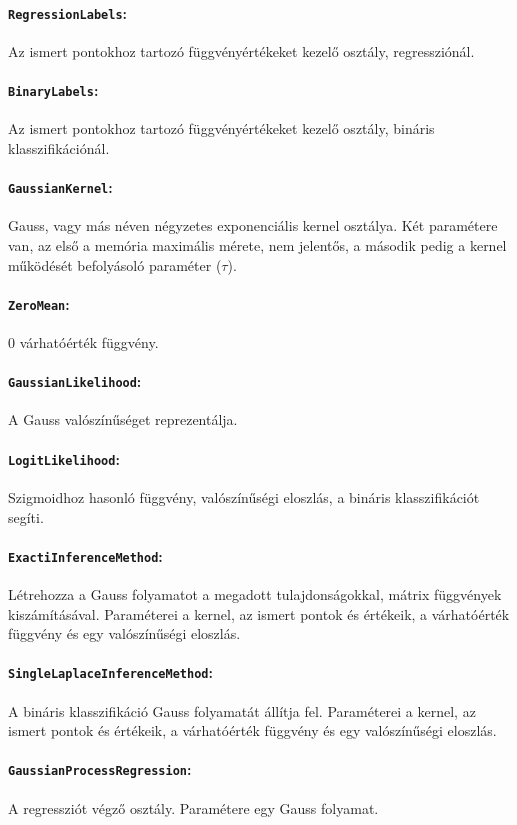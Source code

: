 \paragraph{\texttt{RegressionLabels}:}
Az ismert pontokhoz tartozó függvényértékeket kezelő osztály, regressziónál.
\paragraph{\texttt{BinaryLabels}:} 
Az ismert pontokhoz tartozó függvényértékeket kezelő osztály, bináris klasszifikációnál.
\paragraph{\texttt{GaussianKernel}:}
Gauss, vagy más néven négyzetes exponenciális kernel osztálya. Két paramétere van, az első a memória maximális mérete, nem jelentős, a második pedig a kernel működését befolyásoló paraméter ($\tau$).
\paragraph{\texttt{ZeroMean}:}
0 várhatóérték függvény.
\paragraph{\texttt{GaussianLikelihood}:}
A Gauss valószínűséget reprezentálja.
\paragraph{\texttt{LogitLikelihood}:}
Szigmoidhoz hasonló függvény, valószínűségi eloszlás, a bináris klasszifikációt segíti.
\paragraph{\texttt{ExactiInferenceMethod}:}
Létrehozza a Gauss folyamatot a megadott tulajdonságokkal, mátrix függvények kiszámításával. Paraméterei a kernel, az ismert pontok és értékeik, a várhatóérték függvény és egy valószínűségi eloszlás. 
\paragraph{\texttt{SingleLaplaceInferenceMethod}:}
A bináris klasszifikáció Gauss folyamatát állítja fel. Paraméterei a kernel, az ismert pontok és értékeik, a várhatóérték függvény és egy valószínűségi eloszlás.
\paragraph{\texttt{GaussianProcessRegression}:}
A regressziót végző osztály. Paramétere egy Gauss folyamat.

